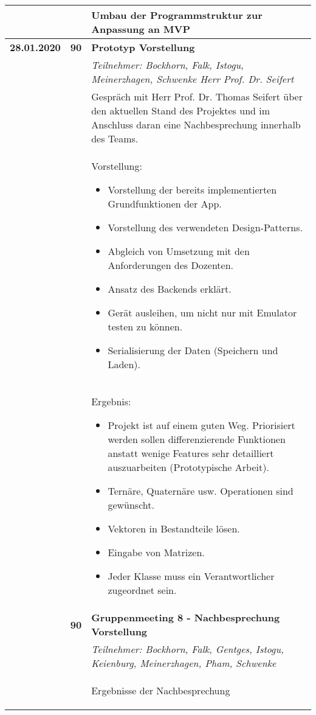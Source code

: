 {{\begin{longtable}{|l|l|p{11cm}|}
			\\ & &
			Umbau der Programmstruktur zur Anpassung an MVP
	\\ \hline
		\textbf{28.01.2020} 
			& \textbf{\hfill90} & \textbf{Prototyp Vorstellung}
			\\ & &
			\small{\textit{Teilnehmer: Bockhorn, Falk, Istogu, Meinerzhagen, Schwenke Herr Prof. Dr. Seifert}}
			\\ & &
			Gespräch mit Herr Prof. Dr. Thomas Seifert über den aktuellen Stand des Projektes und im Anschluss daran eine Nachbesprechung innerhalb des Teams.
			\\ & &
			Vorstellung:
			\begin{itemize}\renewcommand\labelitemi{--}
				\item Vorstellung der bereits implementierten Grundfunktionen der App.
				\item Vorstellung des verwendeten Design-Patterns.
				\item Abgleich von Umsetzung mit den Anforderungen des Dozenten.
				\item Ansatz des Backends erklärt.
				\item Gerät ausleihen, um nicht nur mit Emulator testen zu können.
				\item Serialisierung der Daten (Speichern und Laden).
			\end{itemize}
			\\ & &
			Ergebnis:
			\begin{itemize}\renewcommand\labelitemi{--}
				\item Projekt ist auf einem guten Weg. Priorisiert werden sollen differenzierende Funktionen anstatt wenige Features sehr detailliert auszuarbeiten (Prototypische Arbeit).
				\item Ternäre, Quaternäre usw. Operationen sind gewünscht.
				\item Vektoren in Bestandteile lösen.
				\item Eingabe von Matrizen.
				\item Jeder Klasse muss ein Verantwortlicher zugeordnet sein.
			\end{itemize}		
		\\ \cline{2-3}
		& \textbf{\hfill90} & \textbf{Gruppenmeeting 8 - Nachbesprechung Vorstellung}
			\\ & &
			\small{\textit{Teilnehmer: Bockhorn, Falk, Gentges, Istogu, Keienburg, Meinerzhagen, Pham, Schwenke}}
			\\ & &
			Ergebnisse der Nachbesprechung
			\begin{itemize}\renewcommand\labelitemi{--}

\end{itemize}
\end{longtable}}}
